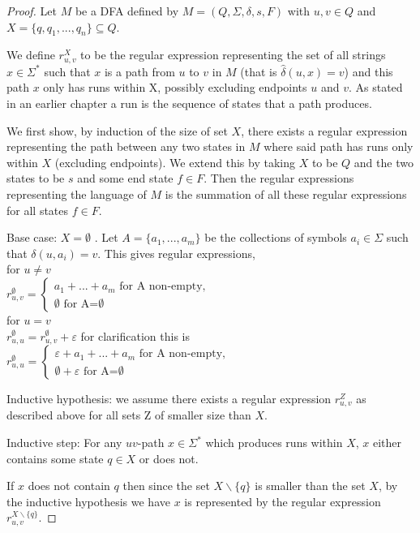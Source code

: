 \documentclass[a4paper,12pt]{report}
\theoremstyle{definition}
\begin{document}
\begin{proof}
Let $M$ be a DFA defined by $M= (Q, \Sigma, \delta, s, F)$ with $u,v \in Q$ and $X = \{q, q_1, ... , q_n\} \subseteq Q$.

We define $r_{u,v}^{X}$ to be the regular expression representing the set of all strings $x\in\Sigma^*$ such that $x$ is a path from $u$ to $v$ in $M$ (that is $\hat{\delta}(u,x)=v$) and this path $x$ only has runs within X, possibly excluding endpoints $u$ and $v$. As stated in an earlier chapter a run is the sequence of states that a path produces. 

We first show, by induction of the size of set $X$, there exists a regular expression representing the path between any two states in $M$ where said path has runs only within $X$ (excluding endpoints). We extend this by taking $X$ to be $Q$ and the two states to be $s$ and some end state $f\in F$. Then the regular expressions representing the language of $M$ is the summation of all these regular expressions for all states $f\in F$. 

Base case: $X= \emptyset $ . Let $A=\{a_1,...,a_m\}$ be the collections of symbols $a_i\in\Sigma$ such that $\delta(u,a_i)=v$.  This gives regular expressions, \\
for $u\neq v$ \\
$r_{u,v}^{\emptyset}=
\begin{cases}
a_1  + ... +  a_m\text{ for A non-empty},\\
\emptyset \text{ for A=}\emptyset
\end{cases}$\\
for $u=v$ \\
$r_{u,u}^{\emptyset}= r_{u,v}^{\emptyset} + \varepsilon$  
for clarification this is 
$r_{u,u}^{\emptyset}=
\begin{cases}
\varepsilon + a_1 + ... + a_m \text{ for A non-empty},\\
\emptyset + \varepsilon \text{ for A=}\emptyset
\end{cases}
$

Inductive hypothesis: 
we assume there exists a regular expression $r_{u,v}^{Z}$ as described above for all sets Z of smaller size than $X$. 

Inductive step: 
For any $uv$-path $x\in\Sigma^*$ which produces runs within $X$, $x$ either contains some state $q\in X$ or does not. 

If $x$ does not contain ${q}$ then since the set $X\backslash \{q\}$ is smaller than the set $X$, by the inductive hypothesis we have  $x$ is represented by the regular expression $r_{u,v}^{X\backslash\{q\}}$.


\end{proof}
\end{document}
